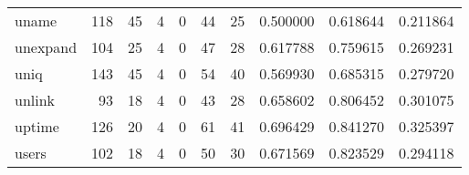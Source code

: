 \begin{tabular}{lrrrrrrrrr}
uname     &                                                118 &                                                 45 &                                                  4 &                                                  0 &                                                 44 &                                                 25 &                                           0.500000 &                               0.618644 &                             0.211864 \\
unexpand  &                                                104 &                                                 25 &                                                  4 &                                                  0 &                                                 47 &                                                 28 &                                           0.617788 &                               0.759615 &                             0.269231 \\
uniq      &                                                143 &                                                 45 &                                                  4 &                                                  0 &                                                 54 &                                                 40 &                                           0.569930 &                               0.685315 &                             0.279720 \\
unlink    &                                                 93 &                                                 18 &                                                  4 &                                                  0 &                                                 43 &                                                 28 &                                           0.658602 &                               0.806452 &                             0.301075 \\
uptime    &                                                126 &                                                 20 &                                                  4 &                                                  0 &                                                 61 &                                                 41 &                                           0.696429 &                               0.841270 &                             0.325397 \\
users     &                                                102 &                                                 18 &                                                  4 &                                                  0 &                                                 50 &                                                 30 &                                           0.671569 &                               0.823529 &                             0.294118 \\

\end{tabular}
